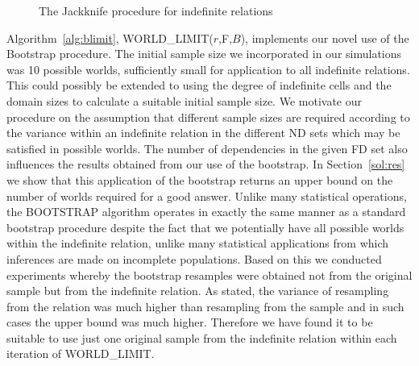{\line
\begin{figure}[ht]
\begin{center}
\caption{\label{cp:fig:jackknife} The Jackknife procedure for
indefinite relations}
\end{center}
\end{figure}
}


\medskip
{}
Algorithm~\ref{alg:blimit}, WORLD\_LIMIT($r$,F,$B$), implements our
novel use of the Bootstrap procedure. The initial sample size we
incorporated in our simulations was 10 possible worlds, sufficiently
small for application to all indefinite relations. This could possibly
be extended to using the degree of indefinite cells and the domain sizes
to calculate a suitable initial sample size.
We motivate our procedure on the assumption that different sample sizes are
required according to the variance within an indefinite relation in
the different ND sets which may be satisfied in possible
worlds. The number of dependencies in the given FD set also influences
the results obtained from our use of the bootstrap. In Section~\ref{sol:res}
we show that this application of the bootstrap returns an upper bound on 
the number of worlds required for a good answer. Unlike many statistical
operations, the BOOTSTRAP
algorithm operates in exactly the same manner as a standard bootstrap
procedure despite the fact that we potentially have all possible worlds
within the indefinite relation, unlike many statistical applications
from which inferences are made on incomplete populations.  Based on
this we conducted experiments 
whereby the bootstrap resamples were obtained not from the original
sample but from the indefinite relation. As stated, the variance of resampling
from the relation
was much higher than resampling from the sample and in such cases the
upper bound was much higher.
Therefore we have found it to be suitable to use just one original sample
from the indefinite relation within each iteration of WORLD\_LIMIT.

